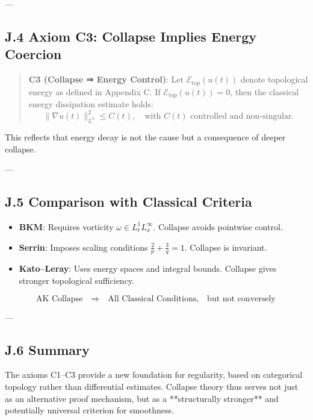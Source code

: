 ---

\subsection*{J.4 Axiom C3: Collapse Implies Energy Coercion}

\begin{quote}
\textbf{C3 (Collapse ⇒ Energy Control)}:  
Let \( \mathcal{E}_{\text{top}}(u(t)) \) denote topological energy as defined in Appendix C.  
If \( \mathcal{E}_{\text{top}}(u(t)) = 0 \), then the classical energy dissipation estimate holds:
\[
\|\nabla u(t)\|_{L^2}^2 \leq C(t), \quad \text{with } C(t) \text{ controlled and non-singular}.
\]
\end{quote}

This reflects that energy decay is not the cause but a consequence of deeper collapse.

---

\subsection*{J.5 Comparison with Classical Criteria}

\begin{itemize}
  \item \textbf{BKM}: Requires vorticity \( \omega \in L^1_t L^\infty_x \). Collapse avoids pointwise control.
  \item \textbf{Serrin}: Imposes scaling conditions \( \frac{2}{p} + \frac{3}{q} = 1 \). Collapse is invariant.
  \item \textbf{Kato–Leray}: Uses energy spaces and integral bounds. Collapse gives stronger topological sufficiency.
\end{itemize}

\[
\boxed{
\text{AK Collapse} \quad \textbf{⇒} \quad \text{All Classical Conditions},
\quad \text{but not conversely}
}
\]

---

\subsection*{J.6 Summary}

The axioms C1–C3 provide a new foundation for regularity, based on  
categorical topology rather than differential estimates.  
Collapse theory thus serves not just as an alternative proof mechanism,  
but as a **structurally stronger** and potentially universal criterion for smoothness.



